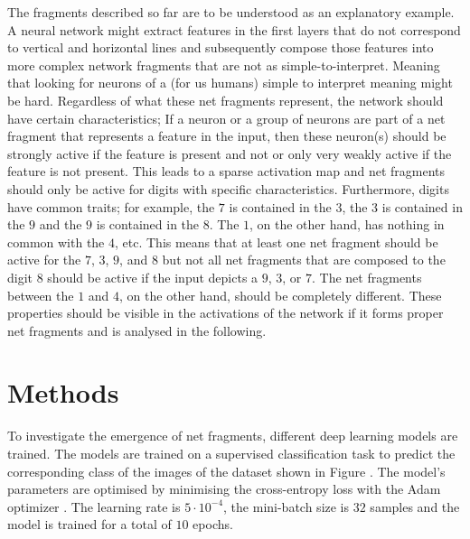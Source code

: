 The fragments described so far are to be understood as an explanatory example.
A neural network might extract features in the first layers that do not correspond to vertical and horizontal lines and subsequently compose those features into more complex network fragments that are not as simple-to-interpret.
Meaning that looking for neurons of a (for us humans) simple to interpret meaning might be hard.
Regardless of what these net fragments represent, the network should have certain characteristics;
If a neuron or a group of neurons are part of a net fragment that represents a feature in the input, then these neuron(s) should be strongly active if the feature is present and not or only very weakly active if the feature is not present.
This leads to a sparse activation map and net fragments should only be active for digits with specific characteristics.
Furthermore, digits have common traits;
for example, the $7$ is contained in the $3$, the $3$ is contained in the $9$ and the $9$ is contained in the $8$.
The $1$, on the other hand, has nothing in common with the $4$, etc.
This means that at least one net fragment should be active for the $7$, $3$, $9$, and $8$ but not all net fragments that are composed to the digit $8$ should be active if the input depicts a $9$, $3$, or $7$.
The net fragments between the $1$ and $4$, on the other hand, should be completely different.
These properties should be visible in the activations of the network if it forms proper net fragments and is analysed in the following.

\section{Methods}
To investigate the emergence of net fragments, different deep learning models are trained.
The models are trained on a supervised classification task to predict the corresponding class of the images of the dataset shown in Figure .
The model's parameters are optimised by minimising the cross-entropy loss with the Adam optimizer .
The learning rate is $5 \cdot 10^{-4}$, the mini-batch size is $32$ samples and the model is trained for a total of $10$ epochs.

